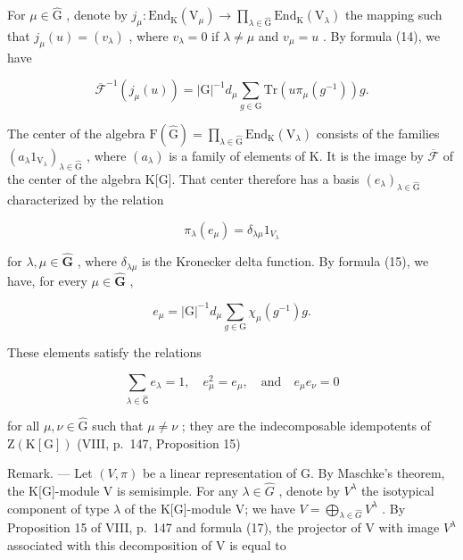 For \(\mu \in \widehat{\mathrm{G}}\) , denote by \(j_{\mu}:\mathrm{End}_{\mathrm{K}}(\mathrm{V}_{\mu})\longrightarrow \prod_{\lambda \in \widehat{\mathrm{G}}} \mathrm{End}_{\mathrm{K}}(\mathrm{V}_{\lambda})\) the mapping such that \(j_{\mu}(u) = (v_{\lambda})\) , where \(v_{\lambda} = 0\) if \(\lambda \neq \mu\) and \(v_{\mu} = u\) . By formula (14), we have

\[
\overline {{\mathcal {F}}} ^ {- 1} (j _ {\mu} (u)) = | \mathrm{G} | ^ {- 1} d _ {\mu} \sum_ {g \in \mathrm{G}} \mathrm{Tr} (u \pi_ {\mu} (g ^ {- 1})) g.\tag{15}
\]

The center of the algebra \(\mathrm{F}(\widehat{\mathrm{G}})=\prod_{\lambda\in\widehat{\mathrm{G}}} \mathrm{End}_{\mathrm{K}}(\mathrm{V}_{\lambda})\) consists of the families \((a_{\lambda}1_{\mathrm{V}_{\lambda}})_{\lambda\in\widehat{\mathrm{G}}}\) , where \((a_{\lambda})\) is a family of elements of K. It is the image by \(\overline{{\mathcal{F}}}\) of the center of the algebra K{[}G{]}. That center therefore has a basis \((e_{\lambda})_{\lambda\in\widehat{\mathrm{G}}}\) characterized by the relation

\[
\pi_ {\lambda} (e _ {\mu}) = \delta_ {\lambda \mu} 1 _ {V _ {\lambda}}\tag{16}
\]

for \(\lambda, \mu \in \widehat{\mathbf{G}}\) , where \(\delta_{\lambda \mu}\) is the Kronecker delta function. By formula (15), we have, for every \(\mu \in \widehat{\mathbf{G}}\) ,

\[
e _ {\mu} = | \mathrm{G} | ^ {- 1} d _ {\mu} \sum_ {g \in \mathrm{G}} \chi_ {\mu} (g ^ {- 1}) g.\tag{17}
\]

These elements satisfy the relations

\[
\sum_ {\lambda \in \widehat {\mathsf {G}}} e _ {\lambda} = 1, \quad e _ {\mu} ^ {2} = e _ {\mu}, \quad \mathrm{and} \quad e _ {\mu} e _ {\nu} = 0\tag{18}
\]

for all \(\mu, \nu \in \widehat{\mathrm{G}}\) such that \(\mu \neq \nu\) ; they are the indecomposable idempotents of \(\mathrm{Z}(\mathrm{K}[\mathrm{G}])\) (VIII, p.~147, Proposition 15)

Remark. --- Let \((V, \pi)\) be a linear representation of G. By Maschke's theorem, the K{[}G{]}-module V is semisimple. For any \(\lambda \in \widehat{G}\) , denote by \(V^{\lambda}\) the isotypical component of type \(\lambda\) of the K{[}G{]}-module V; we have \(V = \bigoplus_{\lambda \in \widehat{G}} V^{\lambda}\) . By Proposition 15 of VIII, p.~147 and formula (17), the projector of V with image \(V^{\lambda}\) associated with this decomposition of V is equal to

